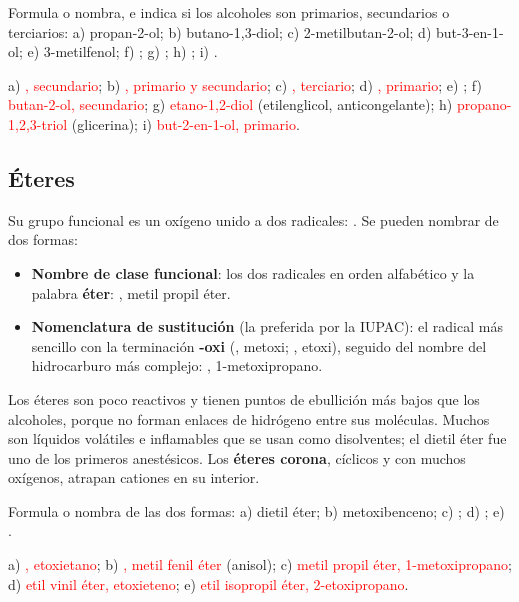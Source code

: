 \begin{exercise}
    Formula o nombra, e indica si los alcoholes son primarios, secundarios o terciarios: a) propan-2-ol; b) butano-1,3-diol; c)
    2-metilbutan-2-ol; d) but-3-en-1-ol; e) 3-metilfenol; f) ; g) ;
    h) ; i) .
    \begin{solu}
        a) \textcolor{red}{, secundario}; b) \textcolor{red}{, primario y secundario};
        c) \textcolor{red}{, terciario}; d) \textcolor{red}{, primario};
        e) \textcolor{red}{}; f) \textcolor{red}{butan-2-ol, secundario};
        g) \textcolor{red}{etano-1,2-diol} (etilenglicol, anticongelante); h) \textcolor{red}{propano-1,2,3-triol} (glicerina);
        i) \textcolor{red}{but-2-en-1-ol, primario}.
    \end{solu}
\end{exercise}

\subsection{Éteres}

Su grupo funcional es un oxígeno unido a dos radicales: . Se pueden nombrar de dos formas:
\begin{itemize}
    \item \textbf{Nombre de clase funcional}: los dos radicales en orden alfabético y la palabra \textbf{éter}:
    , metil propil éter.
    \item \textbf{Nomenclatura de sustitución} (la preferida por la IUPAC): el radical más sencillo con la terminación
    \textbf{-oxi} (, metoxi; , etoxi), seguido del nombre del hidrocarburo más complejo:
    , 1-metoxipropano.
\end{itemize}
Los éteres son poco reactivos y tienen puntos de ebullición más bajos que los alcoholes, porque no forman enlaces de hidrógeno entre
sus moléculas. Muchos son líquidos volátiles e inflamables que se usan como disolventes; el dietil éter fue uno de los primeros
anestésicos. Los \textbf{éteres corona}, cíclicos y con muchos oxígenos, atrapan cationes en su interior.

\begin{exercise}
    Formula o nombra de las dos formas: a) dietil éter; b) metoxibenceno; c) ; d) ;
    e) .
    \begin{solu}
        a) \textcolor{red}{, etoxietano}; b) \textcolor{red}{, metil fenil éter} (anisol);
        c) \textcolor{red}{metil propil éter, 1-metoxipropano}; d) \textcolor{red}{etil vinil éter, etoxieteno};
        e) \textcolor{red}{etil isopropil éter, 2-etoxipropano}.
    \end{solu}
\end{exercise}


